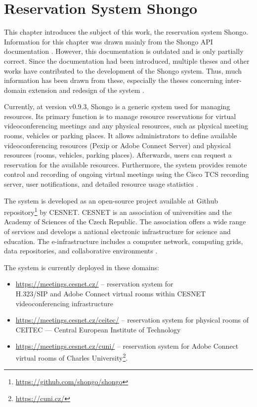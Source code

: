 \chapter{Reservation System Shongo} \label{cha:shongo}
This chapter introduces the subject of this work, the reservation system Shongo.
Information for this chapter was drawn mainly from the Shongo API documentation  \cite{shongoapi}. However, this documentation is outdated and is only partially correct. Since the documentation had been introduced, multiple theses and other works have contributed to the development of the Shongo system. Thus, much information has been drawn from these, especially the theses concerning inter-domain extension \cite{pavelka2016shongo} and redesign of the system \cite{perichta2020}.

Currently, at version v0.9.3, Shongo is a generic system used for managing resources.
Its primary function is to manage resource reservations for virtual videoconferencing meetings and any physical resources, such as physical meeting rooms, vehicles or parking places.
It allows administrators to define available videoconferencing resources (Pexip or Adobe Connect Server) and physical resources (rooms, vehicles, parking places). Afterwards, users can request a reservation for the available resources.
Furthermore, the system provides remote control and recording of ongoing virtual meetings using the Cisco TCS recording server, user notifications, and detailed resource usage statistics \cite{shongo}.

The system is developed as an open-source project available at Github repository\footnote{\url{https://github.com/shongo/shongo}} by CESNET.
CESNET is an association of universities and the Academy of Sciences of the Czech Republic. The association offers a wide range of services and develops a national electronic infrastructure for science and education. The e-infrastructure includes a computer network, computing grids, data repositories, and collaborative environments \cite{cesnet}.

The system is currently deployed in these domains:
\begin{itemize}
    \item \url{https://meetings.cesnet.cz/} -- reservation system for \\
    H.323/SIP and Adobe Connect virtual rooms within CESNET videoconferencing infrastructure
    \item \url{https://meetings.cesnet.cz/ceitec/} -- reservation system for physical rooms of CEITEC --- Central European Institute of Technology
    \item \url{https://meetings.cesnet.cz/cuni/} -- reservation system for Adobe Connect virtual rooms of Charles University\footnote{\url{https://cuni.cz/}}.
\end{itemize}

